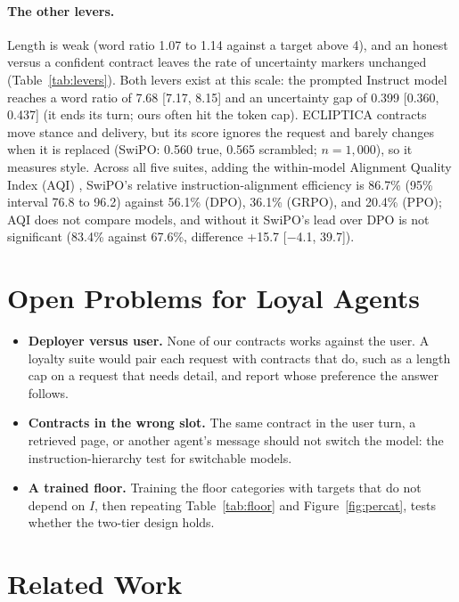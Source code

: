 \documentclass[letterpaper]{article} %
\begin{document}
\paragraph{The other levers.} Length is weak (word ratio 1.07 to 1.14 against a target above 4), and an honest versus a confident contract leaves the rate of uncertainty markers unchanged (Table~\ref{tab:levers}). Both levers exist at this scale: the prompted Instruct model reaches a word ratio of 7.68 [7.17, 8.15] and an uncertainty gap of 0.399 [0.360, 0.437] (it ends its turn; ours often hit the token cap). ECLIPTICA contracts move stance and delivery, but its score ignores the request and barely changes when it is replaced (SwiPO: 0.560 true, 0.565 scrambled; $n=1{,}000$), so it measures style. Across all five suites, adding the within-model Alignment Quality Index (AQI) \cite{borah2025aqi}, SwiPO's relative instruction-alignment efficiency is 86.7\% (95\% interval 76.8 to 96.2) against 56.1\% (DPO), 36.1\% (GRPO), and 20.4\% (PPO); AQI does not compare models, and without it SwiPO's lead over DPO is not significant (83.4\% against 67.6\%, difference +15.7 [$-$4.1, 39.7]).

\section{Open Problems for Loyal Agents}

\begin{itemize}
    \item \textbf{Deployer versus user.} None of our contracts works against the user. A loyalty suite would pair each request with contracts that do, such as a length cap on a request that needs detail, and report whose preference the answer follows.
    \item \textbf{Contracts in the wrong slot.} The same contract in the user turn, a retrieved page, or another agent's message should not switch the model: the instruction-hierarchy test \cite{wallace2024instruction} for switchable models.
    \item \textbf{A trained floor.} Training the floor categories with targets that do not depend on $I$, then repeating Table~\ref{tab:floor} and Figure~\ref{fig:percat}, tests whether the two-tier design holds.
\end{itemize}

\section{Related Work}
\end{document}

